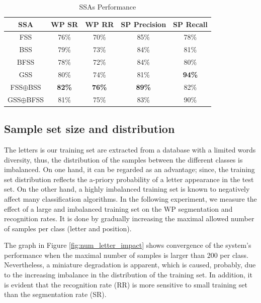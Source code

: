 \documentclass[10pt, conference, compsocconf]{IEEEtran}
\begin{document}
\begin{table}
\caption{SSAs Performance}
\renewcommand{\arraystretch}{1.2}
\begin{tabular}{ | c | c | c | c | c |}
\hline
SSA & WP SR & WP RR & SP Precision & SP Recall\\
\hline                 
  FSS & 76\% & 70\% & 85\% & 78\% \\ 
  \hline
  BSS & 79\% &  73\% & 84\%& 81\% \\
  \hline
  BFSS & 78\% & 72\% & 84\% & 80\%\\ 
  \hline
  GSS & 80\% & 74\% & 81\% & \bf{94}\% \\  
  \hline
  FSS$\oplus$BSS & \bf{82}\% & \bf{76}\% & \bf{89}\% & 82\%\\  
  \hline
  GSS$\oplus$BFSS & 81\% & 75\% & 83\% & 90\% \\
  \hline
\end{tabular}
\centering
\label{table:ss_algorithms_results} 
\vspace{-10pt}
\end{table}

\subsection{Sample set size and distribution}
The letters is our training set are extracted from a database with a limited words diversity, thus, the distribution of the samples between the different classes is imbalanced. 
On one hand, it can be regarded as an advantage; since, the training set distribution reflects the a-priory probability of a letter appearance in the test set. 
On the other hand, a highly imbalanced training set is known to negatively affect many classification algorithms.
In the following experiment, we measure the effect of a large and imbalanced training set on the WP segmentation and recognition rates. 
It is done by gradually increasing the maximal allowed number of samples per class (letter and position).
 
The graph in Figure \ref{fig:num_letter_impact} shows convergence of the system's performance when the maximal number of samples is larger than 200 per class. 
Nevertheless, a miniature degradation is apparent, which is caused, probably, due to the increasing imbalance in the distribution of the training set.
In addition, it is evident that the recognition rate (RR) is more sensitive to small training set than the segmentation rate (SR).
\end{document}
